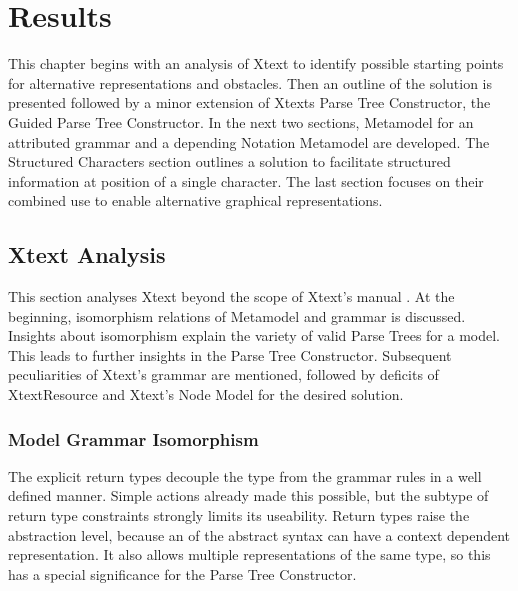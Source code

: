 \chapter{Results}
This chapter begins with an analysis of Xtext to identify possible starting points for alternative representations and obstacles. Then an outline of the solution is presented followed by a minor extension of Xtexts Parse Tree Constructor, the Guided Parse Tree Constructor. In the next two sections, Metamodel for an attributed grammar and a depending Notation Metamodel are developed. The Structured Characters section outlines a solution to facilitate structured information at position of a single character. The last section focuses on their combined use to enable alternative graphical representations.

\section{Xtext Analysis}
This section analyses Xtext beyond the scope of Xtext's manual \cite{XTextMan}. At the beginning, isomorphism relations of Metamodel and grammar is discussed. Insights about isomorphism explain the variety of valid Parse Trees for a model. This leads to further insights in the Parse Tree Constructor. Subsequent peculiarities of Xtext's grammar are mentioned, followed by deficits of XtextResource and Xtext's Node Model for the desired solution.

\subsection{Model Grammar Isomorphism} \label{sec:isomorph}
The explicit return types decouple the  type from the grammar rules in a well defined manner. Simple actions already made this possible, but the subtype of return type constraints strongly limits its useability. Return types raise the abstraction level, because an  of the abstract syntax can have a context dependent representation. It also allows multiple representations of the same  type, so this has a special significance for the Parse Tree Constructor.

